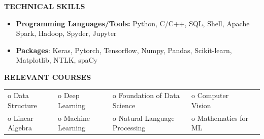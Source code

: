 \documentclass{article}
\begin{document}
\vspace{-2.7mm}


 \begin{theorem}
   \vspace{-0.7mm}
\begin{center}
\textbf{ TECHNICAL SKILLS
}\end{center}  
\vspace{-0.9mm}    
   \end{theorem}
\vspace{-3 mm}
\begin{itemize}

 \item \textbf{Programming Languages/Tools:}
 Python, C/C++, SQL, Shell,  Apache Spark, Hadoop, Spyder, Jupyter
\vspace{-0.5cm}
\item \textbf{Packages}: Keras, Pytorch, Tensorflow, Numpy, Pandas, Scikit-learn, Matplotlib, NTLK, spaCy

\end{itemize}
\vspace{-3.5mm}

 \begin{theorem}
   \vspace{-0.7mm}
\begin{center}
\textbf{ RELEVANT COURSES
}\end{center}  
\vspace{-0.7mm}    
   \end{theorem}
\vspace{-4.5mm}

\begin{table}[htbp]

\centering
\begin{tabular}{lllll}

  o Data Structure & o Deep Learning &   o  Foundation of Data Science   &  o Computer Vision  &  \\
o Linear Algebra & o Machine Learning &  o Natural Language Processing  & o Mathematics for ML
\end{tabular}
\end{table}
\vspace{-2mm}



\end{document}
